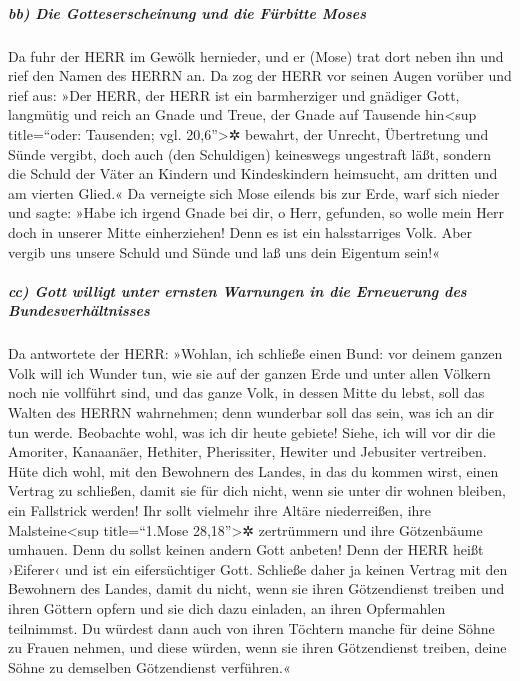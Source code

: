 \hypertarget{bb-die-gotteserscheinung-und-die-fuxfcrbitte-moses}{%
\subparagraph{bb) Die Gotteserscheinung und die Fürbitte
Moses}\label{bb-die-gotteserscheinung-und-die-fuxfcrbitte-moses}}

 Da fuhr der HERR im Gewölk hernieder, und er (Mose) trat
dort neben ihn und rief den Namen des HERRN an.  Da zog
der HERR vor seinen Augen vorüber und rief aus: »Der HERR, der HERR ist
ein barmherziger und gnädiger Gott, langmütig und reich an Gnade und
Treue,  der Gnade auf Tausende hin\textless sup
title=``oder: Tausenden; vgl. 20,6''\textgreater✲ bewahrt, der Unrecht,
Übertretung und Sünde vergibt, doch auch (den Schuldigen) keineswegs
ungestraft läßt, sondern die Schuld der Väter an Kindern und
Kindeskindern heimsucht, am dritten und am vierten Glied.«
 Da verneigte sich Mose eilends bis zur Erde, warf sich
nieder  und sagte: »Habe ich irgend Gnade bei dir, o Herr,
gefunden, so wolle mein Herr doch in unserer Mitte einherziehen! Denn es
ist ein halsstarriges Volk. Aber vergib uns unsere Schuld und Sünde und
laß uns dein Eigentum sein!«

\hypertarget{cc-gott-willigt-unter-ernsten-warnungen-in-die-erneuerung-des-bundesverhuxe4ltnisses}{%
\subparagraph{cc) Gott willigt unter ernsten Warnungen in die Erneuerung
des
Bundesverhältnisses}\label{cc-gott-willigt-unter-ernsten-warnungen-in-die-erneuerung-des-bundesverhuxe4ltnisses}}

 Da antwortete der HERR: »Wohlan, ich schließe einen
Bund: vor deinem ganzen Volk will ich Wunder tun, wie sie auf der ganzen
Erde und unter allen Völkern noch nie vollführt sind, und das ganze
Volk, in dessen Mitte du lebst, soll das Walten des HERRN wahrnehmen;
denn wunderbar soll das sein, was ich an dir tun werde. 
Beobachte wohl, was ich dir heute gebiete! Siehe, ich will vor dir die
Amoriter, Kanaanäer, Hethiter, Pherissiter, Hewiter und Jebusiter
vertreiben.  Hüte dich wohl, mit den Bewohnern des
Landes, in das du kommen wirst, einen Vertrag zu schließen, damit sie
für dich nicht, wenn sie unter dir wohnen bleiben, ein Fallstrick
werden!  Ihr sollt vielmehr ihre Altäre niederreißen,
ihre Malsteine\textless sup title=``1.Mose 28,18''\textgreater✲
zertrümmern und ihre Götzenbäume umhauen.  Denn du sollst
keinen andern Gott anbeten! Denn der HERR heißt ›Eiferer‹ und ist ein
eifersüchtiger Gott.  Schließe daher ja keinen Vertrag
mit den Bewohnern des Landes, damit du nicht, wenn sie ihren
Götzendienst treiben und ihren Göttern opfern und sie dich dazu
einladen, an ihren Opfermahlen teilnimmst.  Du würdest
dann auch von ihren Töchtern manche für deine Söhne zu Frauen nehmen,
und diese würden, wenn sie ihren Götzendienst treiben, deine Söhne zu
demselben Götzendienst verführen.«

